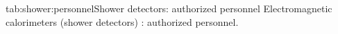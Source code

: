 \begin{namestab}{tab:shower:personnel}{Shower detectors: authorized personnel}{%
      Electromagnetic calorimeters (shower detectors) : authorized personnel.}
  \BogdanWojtsekhowski{}
  \JackSegal{}
  \HakobVoskanyan{}
\end{namestab}


%
%
%
%
%
%
